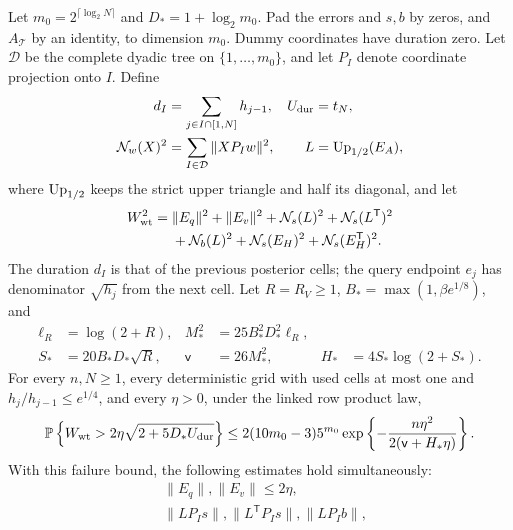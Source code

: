 \begin{lemma}
\label{u:lem:weighted}
Let $m_0=2^{\lceil\log_2N\rceil}$ and $D_*=1+\log_2m_0$.
Pad the errors and $s,b$ by zeros, and $A_{\mathcal T}$ by an identity,
to dimension $m_0$. Dummy coordinates have duration zero. Let
$\mathcal D$ be the complete dyadic tree on $\{1,\ldots,m_0\}$, and
let $P_I$ denote coordinate projection onto $I$. Define
\begin{equation}\label{u:eq:weighted-definitions}
\begin{aligned}
 d_I&=\sum_{j\in I\cap[1,N]}h_{j-1},
 &U_{\rm dur}&=t_N,\\
 \mathcal N_w(X)^2&=\sum_{I\in\mathcal D}\|XP_Iw\|^2,
 &L&=\operatorname{Up}_{1/2}(E_A),
\end{aligned}
\end{equation}
where $\operatorname{Up}_{1/2}$ keeps the strict upper triangle and half its diagonal, and
let
\[
\begin{aligned}
 W_{\rm wt}^2={}&\|E_q\|^2+\|E_v\|^2
 +\mathcal N_s(L)^2+\mathcal N_s(L^{\mathsf T})^2\\
 &+\mathcal N_b(L)^2+\mathcal N_s(E_H)^2
 +\mathcal N_s(E_H^{\mathsf T})^2.
\end{aligned}
\]
The duration $d_I$ is that of the previous posterior cells; the query
endpoint $e_j$ has denominator $\sqrt{h_j}$ from the next cell.
Let $R=R_V\ge1$, $B_*=\max(1,\beta e^{1/8})$, and
\begin{equation}\label{u:eq:weighted-parameters}
\begin{aligned}
 \ell_R&=\log(2+R),
 &M_*^2&=25B_*^2D_*^2\ell_R,\\
 S_*&=20B_*D_*\sqrt R,
 &\mathsf v&=26M_*^2,
 &H_*&=4S_*\log(2+S_*).
\end{aligned}
\end{equation}
For every $n,N\ge1$, every deterministic grid with used cells at most
one and $h_j/h_{j-1}\le e^{1/4}$, and every $\eta>0$, under the
linked row product law,
\begin{equation}\label{u:eq:weighted-tail}
 \mathbb P\left\{W_{\rm wt}>2\eta\sqrt{2+5D_*U_{\rm dur}}\right\}
 \le2(10m_0-3)5^{m_0}
 \exp\left\{-\frac{n\eta^2}{2(\mathsf v+H_*\eta)}\right\}.
\end{equation}
With this failure bound, the following estimates hold simultaneously:
\begin{equation}\label{u:eq:weighted-node-bounds}
\begin{aligned}
 &\|E_q\|,\|E_v\|\le2\eta,\\
 &\|LP_Is\|,\|L^{\mathsf T}P_Is\|,\|LP_Ib\|,

\end{aligned}
\end{equation}
\end{lemma}
